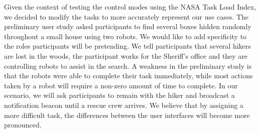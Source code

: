 Given the context of testing the control modes using the NASA Task Load Index, we decided to modify the tasks to more accurately represent our use cases. The preliminary user study asked participants to find several boxes hidden randomly throughout a small house using two robots. We would like to add specificity to the roles participants will be pretending. We tell participants that several hikers are lost in the woods, the participant works for the Sheriff's office and they are controlling robots to assist in the search. A weakness in the preliminary study is that the robots were able to complete their task immediately, while most actions taken by a robot will require a non-zero amount of time to complete. In our scenario, we will ask participants to remain with the hiker and broadcast a notification beacon until a rescue crew arrives. We believe that by assigning a more difficult task, the differences between the user interfaces will become more pronounced.